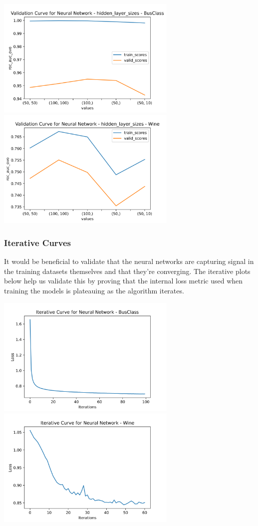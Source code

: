 \documentclass[
	letterpaper, %
]{jdf}
\begin{document}
\includegraphics[width=3.4in]{Figures/BusClass-0920/NN/val_curve_1.png}
\includegraphics[width=3.4in]{Figures/Wine-0921/NN/val_curve_1.png}

\subsubsection{Iterative Curves}
It would be beneficial to validate that the neural networks are capturing signal in the training datasets themselves and that they're converging. The iterative plots below help us validate this by proving that the internal loss metric used when training the models is plateauing as the algorithm iterates.

\includegraphics[width=3.4in]{Figures/BusClass-0920/NN/bus_class_iterative_curve.png}
\includegraphics[width=3.4in]{Figures/Wine-0921/NN/wine_iterative_curve.png}
\end{document}
